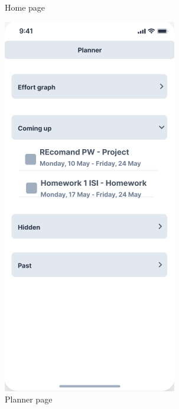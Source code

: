 \begin{figure}[!ht]
\begin{minipage}[b]{0.45\textwidth}
        \caption{Home page}
        \label{5:fig:homepage}
    \end{minipage}
    \hfill
    \begin{minipage}[b]{0.45\textwidth}
        \captionsetup{justification=centering}
        \includegraphics[width=\textwidth]{figures/wf/image7.png}
        \caption{Planner page}
        \label{5:fig:planner}
    \end{minipage}
    
\end{figure}
